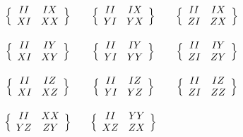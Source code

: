\documentclass[11pt]{article}
\theoremstyle{note}
\begin{document}
\begin{figure}
\begin{equation*}
\begin{array}{c @{\qquad} c @{\qquad} c}
\Big\{\begin{array}{cc}
II & IX \\
XI & XX
\end{array}\Big\}
&
\Big\{\begin{array}{cc}
II & IX \\
YI & YX
\end{array}\Big\}
&
\Big\{\begin{array}{cc}
II & IX \\
ZI & ZX
\end{array}\Big\}
\\
& & \\ %
\Big\{\begin{array}{cc}
II & IY \\
XI & XY
\end{array}\Big\}
&
\Big\{\begin{array}{cc}
II & IY \\
YI & YY
\end{array}\Big\}
&
\Big\{\begin{array}{cc}
II & IY \\
ZI & ZY
\end{array}\Big\}
\\
& & \\ %
\Big\{\begin{array}{cc}
II & IZ \\
XI & XZ
\end{array}\Big\}
&
\Big\{\begin{array}{cc}
II & IZ \\
YI & YZ
\end{array}\Big\}
&
\Big\{\begin{array}{cc}
II & IZ \\
ZI & ZZ
\end{array}\Big\}
\\
& & \\ %
\Big\{\begin{array}{cc}
II & XX \\
YZ & ZY
\end{array}\Big\}
&
\Big\{\begin{array}{cc}
II & YY \\
XZ & ZX
\end{array}\Big\}

\end{array}
\end{equation*}
\end{figure}
\end{document}
